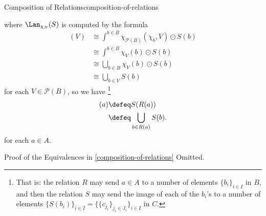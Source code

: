 \begin{definition}{Composition of Relations}{composition-of-relations}
\begin{enumerate}
\begin{webcompile}
%
            \end{webcompile}
            where $\Lan_{\chi_{B}}(S)$ is computed by the formula
            \begin{align*}
                [\Lan_{\chi_{B}}(S)](V) &\cong \int^{b\in B}\chi_{\mathcal{P}(B)}(\chi_{b},V)\odot S(b)\\
                                        &\cong \int^{b\in B}\chi_{V}(b)\odot S(b)\\
                                        &\cong \bigcup_{b\in B}\chi_{V}(b)\odot S(b)\\
                                        &\cong \bigcup_{b\in V}S(b)
            \end{align*}
            for each $V\in\mathcal{P}(B)$, so we have%
            \footnote{%
                That is: the relation $R$ may send $a\in A$ to a number of elements $\{b_{i}\}_{i\in I}$ in $B$, and then the relation $S$ may send the image of each of the $b_{i}$'s to a number of elements $\{S(b_{i})\}_{i\in I}=\{\{c_{j_{i}}\}_{j_{i}\in J_{i}}\}_{i\in I}$ in $C$.
                \par\vspace*{\TCBBoxCorrection}
            }%
            \begin{align*}
                [S\procirc R](a) &\defeq S(R(a))\\
                                 &\defeq \bigcup_{b\in R(a)}S(b).
            \end{align*}
            for each $a\in A$.
    \end{enumerate}
\end{definition}
\begin{Proof}{Proof of the Equivalences in \cref{composition-of-relations}}%
  Omitted.
\end{Proof}
